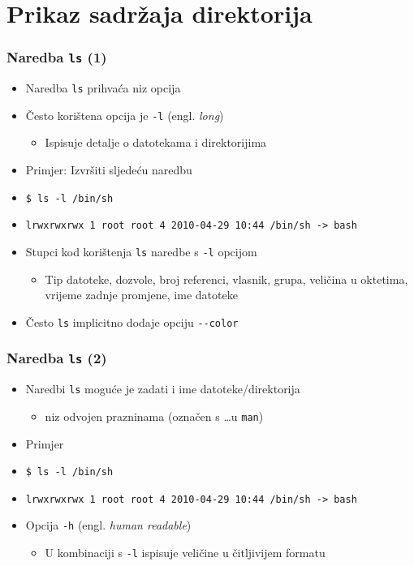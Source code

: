 \documentclass{beamer}
\begin{document}
\section{Prikaz sadržaja direktorija}
\begin{frame}[t]
\frametitle{Naredba \texttt{ls} (1)}
\begin{itemize}
  \item Naredba \texttt{ls} prihvaća niz opcija
  \item Često korištena opcija je \texttt{-l} (engl. \emph{long})
  \begin{itemize}
    \item Ispisuje detalje o datotekama i direktorijima
  \end{itemize}
  \item Primjer: Izvršiti sljedeću naredbu
  \item[] \small\texttt{\$ ls -l /bin/sh}
  \item[] \small\texttt{lrwxrwxrwx 1 root root 4 2010-04-29 10:44 /bin/sh
                        -> bash}

  \hspace{5ex}
  \item Stupci kod korištenja \texttt{ls} naredbe s \texttt{-l} opcijom
  \begin{itemize}
    \item Tip datoteke, dozvole, broj referenci, vlasnik, grupa, veličina
          u oktetima, vrijeme zadnje promjene, ime datoteke
  \end{itemize}
  \item Često \texttt{ls} implicitno dodaje opciju \texttt{-{}-color}
\end{itemize}
\end{frame}


\begin{frame}[t]
\frametitle{Naredba \texttt{ls} (2)}
\begin{itemize}
  \item Naredbi \texttt{ls} moguće je zadati i ime datoteke/direktorija
  \begin{itemize}
    \item niz odvojen prazninama (označen s \ldots u \texttt{man})
  \end{itemize}
  \item Primjer
  \item[] \small\texttt{\$ ls -l /bin/sh}
  \item[] \small\texttt{lrwxrwxrwx 1 root root 4 2010-04-29 10:44 /bin/sh
                        -> bash}
  \item Opcija \texttt{-h} (engl. \emph{human readable})
  \begin{itemize}
    \item U kombinaciji s \texttt{-l} ispisuje veličine u čitljivijem
          formatu
  \end{itemize}
\end{itemize}
\end{frame}
\end{document}
